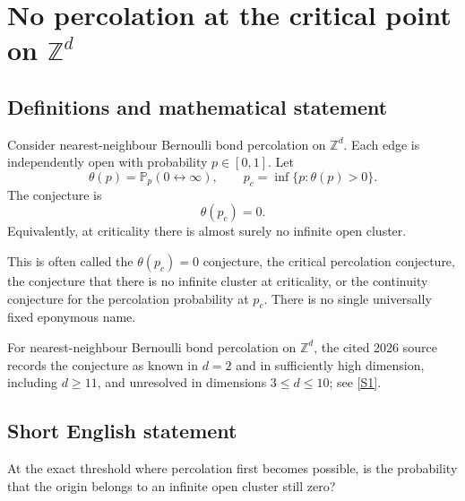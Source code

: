 \documentclass[11pt]{article}
\begin{document}
\section*{\texorpdfstring{No percolation at the critical point on $\mathbb{Z}^d$}{No percolation at the critical point on \$\textbackslash{}mathbb\{Z\}\textasciicircum{}d\$}}\label{critical-percolation}\label{statement}

\subsection{Definitions and mathematical statement}
Consider nearest-neighbour Bernoulli bond percolation on \(\mathbb Z^d\). Each edge is independently open with probability \(p\in[0,1]\). Let
\[
\theta(p)=\mathbb P_p(0\leftrightarrow\infty),
\qquad
p_c=\inf\{p:\theta(p)>0\}.
\]
The conjecture is
\[
\boxed{\theta(p_c)=0.}
\]
Equivalently, at criticality there is almost surely no infinite open cluster.

This is often called the \(\theta(p_c)=0\) conjecture, the critical percolation conjecture, the conjecture that there is no infinite cluster at criticality, or the continuity conjecture for the percolation probability at \(p_c\). There is no single universally fixed eponymous name.

For nearest-neighbour Bernoulli bond percolation on \(\mathbb Z^d\), the cited 2026 source records the conjecture as known in \(d=2\) and in sufficiently high dimension, including \(d\ge11\), and unresolved in dimensions \(3\le d\le10\); see \href{https://arxiv.org/html/2608.23661v1}{[S1]}.

\subsection{Short English statement}
At the exact threshold where percolation first becomes possible, is the probability that the origin belongs to an infinite open cluster still zero?
\end{document}
